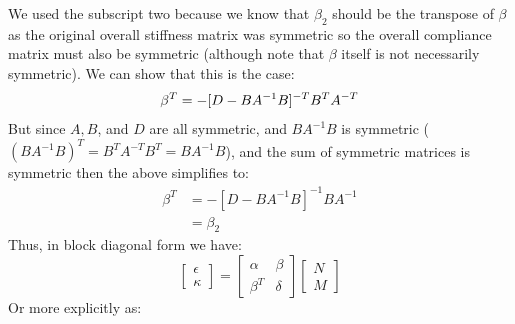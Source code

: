 \documentclass{article}
\begin{document}
We used the subscript two because we know that $\beta_2$ should be the transpose of $\beta$ as the original overall stiffness matrix was symmetric so the overall compliance matrix must also be symmetric (although note that $\beta$ itself is not necessarily symmetric).  We can show that this is the case:
\begin{equation}
\beta^T = - [D - B A^{-1} B]^{-T} B^T A^{-T} \\
\end{equation}
But since $A, B$, and $D$ are all symmetric, and $B A^{-1} B$ is symmetric ($(B A^{-1} B)^T = B^T A^{-T} B^T = B A^{-1} B$), and the sum of symmetric matrices is symmetric then the above simplifies to:
\begin{equation}
\begin{aligned}
\beta^T &= - [D - B A^{-1} B]^{-1} B A^{-1} \\
&= \beta_2
\end{aligned}
\end{equation}
Thus, in block diagonal form we have:
\begin{equation}
\begin{bmatrix}
    \epsilon\\
    \kappa
\end{bmatrix}
=
\begin{bmatrix}
    \alpha & \beta \\
    \beta^T & \delta
\end{bmatrix}
\begin{bmatrix}
    N\\
    M
\end{bmatrix}
\end{equation}
Or more explicitly as:
\end{document}
